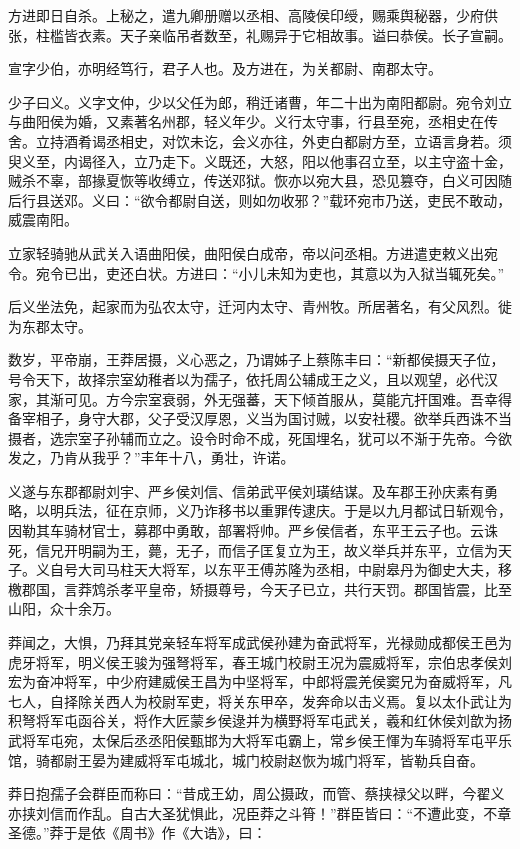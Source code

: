 \documentclass[]{article}
\begin{document}
方进即日自杀。上秘之，遣九卿册赠以丞相、高陵侯印绶，赐乘舆秘器，少府供张，柱槛皆衣素。天子亲临吊者数至，礼赐异于它相故事。谥曰恭侯。长子宣嗣。

宣字少伯，亦明经笃行，君子人也。及方进在，为关都尉、南郡太守。

少子曰义。义字文仲，少以父任为郎，稍迁诸曹，年二十出为南阳都尉。宛令刘立与曲阳侯为婚，又素著名州郡，轻义年少。义行太守事，行县至宛，丞相史在传舍。立持酒肴谒丞相史，对饮未讫，会义亦往，外吏白都尉方至，立语言身若。须臾义至，内谒径入，立乃走下。义既还，大怒，阳以他事召立至，以主守盗十金，贼杀不辜，部掾夏恢等收缚立，传送邓狱。恢亦以宛大县，恐见篡夺，白义可因随后行县送邓。义曰：``欲令都尉自送，则如勿收邪？''载环宛市乃送，吏民不敢动，威震南阳。

立家轻骑驰从武关入语曲阳侯，曲阳侯白成帝，帝以问丞相。方进遣吏敕义出宛令。宛令已出，吏还白状。方进曰：``小儿未知为吏也，其意以为入狱当辄死矣。''

后义坐法免，起家而为弘农太守，迁河内太守、青州牧。所居著名，有父风烈。徙为东郡太守。

数岁，平帝崩，王莽居摄，义心恶之，乃谓姊子上蔡陈丰曰：``新都侯摄天子位，号令天下，故择宗室幼稚者以为孺子，依托周公辅成王之义，且以观望，必代汉家，其渐可见。方今宗室衰弱，外无强蕃，天下倾首服从，莫能亢扞国难。吾幸得备宰相子，身守大郡，父子受汉厚恩，义当为国讨贼，以安社稷。欲举兵西诛不当摄者，选宗室子孙辅而立之。设令时命不成，死国埋名，犹可以不渐于先帝。今欲发之，乃肯从我乎？''丰年十八，勇壮，许诺。

义遂与东郡都尉刘宇、严乡侯刘信、信弟武平侯刘璜结谋。及车郡王孙庆素有勇略，以明兵法，征在京师，义乃诈移书以重罪传逮庆。于是以九月都试日斩观令，因勒其车骑材官士，募郡中勇敢，部署将帅。严乡侯信者，东平王云子也。云诛死，信兄开明嗣为王，薨，无子，而信子匡复立为王，故义举兵并东平，立信为天子。义自号大司马柱天大将军，以东平王傅苏隆为丞相，中尉皋丹为御史大夫，移檄郡国，言莽鸩杀孝平皇帝，矫摄尊号，今天子已立，共行天罚。郡国皆震，比至山阳，众十余万。

莽闻之，大惧，乃拜其党亲轻车将军成武侯孙建为奋武将军，光禄勋成都侯王邑为虎牙将军，明义侯王骏为强弩将军，春王城门校尉王况为震威将军，宗伯忠孝侯刘宏为奋冲将军，中少府建威侯王昌为中坚将军，中郎将震羌侯窦兄为奋威将军，凡七人，自择除关西人为校尉军吏，将关东甲卒，发奔命以击义焉。复以太仆武让为积弩将军屯函谷关，将作大匠蒙乡侯逯并为横野将军屯武关，羲和红休侯刘歆为扬武将军屯宛，太保后丞丞阳侯甄邯为大将军屯霸上，常乡侯王惲为车骑将军屯平乐馆，骑都尉王晏为建威将军屯城北，城门校尉赵恢为城门将军，皆勒兵自奋。

莽日抱孺子会群臣而称曰：``昔成王幼，周公摄政，而管、蔡挟禄父以畔，今翟义亦挟刘信而作乱。自古大圣犹惧此，况臣莽之斗筲！''群臣皆曰：``不遭此变，不章圣德。''莽于是依《周书》作《大诰》，曰：
\end{document}
